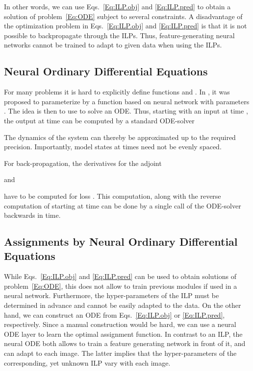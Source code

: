 \documentclass[runningheads]{llncs}
\begin{document}
In other words, we can use Eqs.~\eqref{Eq:ILP.obj} and \eqref{Eq:ILP.pred} to obtain a solution of problem~\eqref{Eq:ODE} subject to several constraints. A disadvantage of the optimization problem in Eqs.~\eqref{Eq:ILP.obj} and \eqref{Eq:ILP.pred} is that it is not possible to backpropagate through the ILPs. Thus, feature-generating neural networks cannot be trained to adapt to given data when using the ILPs.





\subsection{Neural Ordinary Differential Equations~\cite{Chen2018:NODE}} 
\label{Sec:NODE} 
For many problems it is hard to explicitly define functions  and . In \cite{Chen2018:NODE}, it was proposed to parameterize  by a function  based on neural network with parameters . The idea is then to use  to solve an ODE. 
Thus, starting with an input  at time , the output at time  can be computed by a standard ODE-solver 

The dynamics of the system can thereby be approximated up to the required precision. Importantly, model states at times  need not be evenly spaced. 






For back-propagation, the derivatives for the adjoint  

and

have to be computed for loss . This computation, along with the reverse computation of  starting at time  can be done by a single call of the ODE-solver backwards in time. 





\subsection{Assignments by Neural Ordinary Differential Equations}
\label{Sec:Assignments}

While Eqs.~\eqref{Eq:ILP.obj} and \eqref{Eq:ILP.pred} can be used to obtain solutions of problem~\eqref{Eq:ODE}, this does not allow to train previous modules if used in a neural network. Furthermore, the hyper-parameters of the ILP must be determined in advance and cannot be easily adapted to the data. On the other hand, we can construct an ODE from Eqs.~\eqref{Eq:ILP.obj} or \eqref{Eq:ILP.pred}, respectively. Since a manual construction would be hard, we can use a neural ODE layer to learn the optimal assignment function. In contrast to an ILP, the neural ODE both allows to train a feature generating network in front of it, and can adapt to each image. The latter implies that the hyper-parameters of the corresponding, yet unknown ILP vary with each image.
\end{document}
